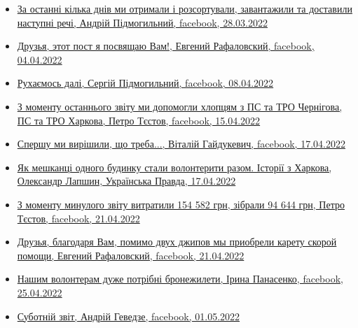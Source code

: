 \begin{itemize} %

\item \hyperlink{28_03_2022.fb.pidmogylnyj_andrij.kiev.terra_incognita.1.rechi}{%
За останні кілька днів ми отримали і розсортували, завантажили та доставили наступні речі, %
Андрій Підмогильний, facebook, 28.03.2022%
}

\item \hyperlink{04_04_2022.fb.rafalovskij_evgenij.kiev.1.druzja_post}{%
Друзья, этот пост я посвящаю Вам!, Евгений Рафаловский, facebook, %
04.04.2022%
}

\item \hyperlink{08_04_2022.fb.pidmogylnyj_sergij.1.ruhaemos_dali}{%
Рухаємось далі, Сергій Підмогильний, facebook, 08.04.2022%
}

\item \hyperlink{15_04_2022.fb.testov_petro.kiev.1.zvit_chernigov_harkov}{%
З моменту останнього звіту ми допомогли хлопцям з ПС та ТРО Чернігова, ПС та ТРО Харкова, %
Петро Тєстов, facebook, 15.04.2022%
}

\item \hyperlink{17_04_2022.fb.gajdukevich_vitalij.1.spershu_my_vyrishyly}{%
Спершу ми вирішили, що треба..., Віталій Гайдукевич, facebook, 17.04.2022%
}

\item \hyperlink{17_04_2022.stz.news.ua.pravda.2.budynok_volontery_istorii_harkov}{%
Як мешканці одного будинку стали волонтерити разом. Історії з Харкова, Олександр Лапшин, Українська Правда, %
17.04.2022%
}

\item \hyperlink{21_04_2022.fb.testov_petro.kiev.1.zvit}{%
З моменту минулого звіту витратили 154 582 грн, зібрали 94 644 грн, Петро Тєстов, facebook, 21.04.2022%
}

\item \hyperlink{21_04_2022.fb.rafalovskij_evgenij.kiev.1.kareta_skoroj_pomoschi}{%
Друзья, благодаря Вам, помимо двух джипов мы приобрели карету скорой помощи, Евгений Рафаловский, facebook, %
21.04.2022%
}

\item \hyperlink{25_04_2022.fb.panasenko_iryna.harkiv.1.volontery_broniki}{%
Нашим волонтерам дуже потрібні бронежилети, Ірина Панасенко, facebook, 25.04.2022%
}

\item \hyperlink{01_05_2022.fb.gevedze_andrij.kiev.1.subotnij_zvit}{%
Суботній звіт, Андрій Геведзе, facebook, 01.05.2022%
}


\end{itemize}
